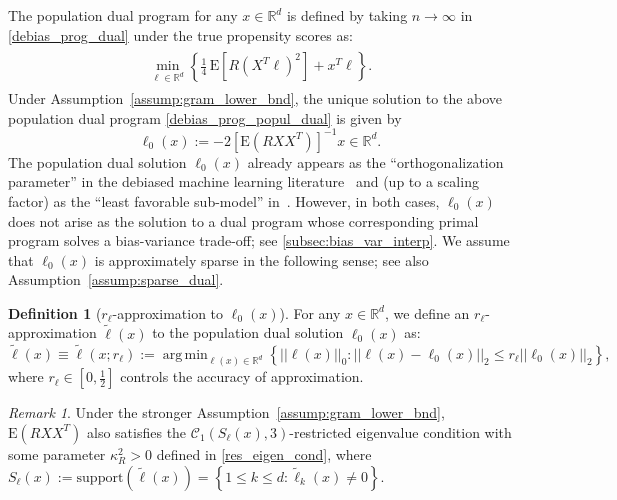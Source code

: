 \documentclass[ejsv2,noshowframe]{imsart}
\theoremstyle{plain}
\theoremstyle{definition}
\newtheorem{definition}[theorem]{Definition}
\theoremstyle{remark}
\newtheorem{remark}{Remark}
\DeclareMathOperator*{\argmin}{arg\,min}
\newcommand{\norm}[1]{\left|\left| #1 \right|\right|}
\renewcommand{\tilde}{\widetilde}
\begin{document}
The population dual program for any $x\in \mathbb{R}^d$ is defined by taking $n\to \infty$ in \eqref{debias_prog_dual} under the true propensity scores as:
\begin{align}
	\label{debias_prog_popul_dual}
	\begin{split}
		\min_{\ell \in \mathbb{R}^d} \left\{ \frac{1}{4}\, \mathrm{E}\left[R \left(X^T\ell\right)^2\right] + x^T \ell  \right\}.
	\end{split}
\end{align}
Under Assumption~\ref{assump:gram_lower_bnd}, the unique solution to the above population dual program \eqref{debias_prog_popul_dual} is given by
\begin{equation}
	\label{popul_dual_exact}
	\ell_0(x) := -2\left[\mathrm{E}\left(R XX^T\right)\right]^{-1} x \in \mathbb{R}^d.
\end{equation}
The population dual solution $\ell_0(x)$ already appears as the ``orthogonalization parameter'' in the debiased machine learning literature~\citep[e.g.][Example 2.1]{chernozhukov2018double} and (up to a scaling factor) as the ``least favorable sub-model'' in~\cite{bellec2022biasing}. However, in both cases, $\ell_0(x)$ does not arise as the solution to a dual program whose corresponding primal program solves a bias-variance trade-off; see \autoref{subsec:bias_var_interp}. We assume that $\ell_0(x)$ is approximately sparse in the following sense; see also Assumption~\ref{assump:sparse_dual}.

\begin{definition}[$r_{\ell}$-approximation to $\ell_0(x)$]
	\label{defn:popul_dual}
	For any $x\in \mathbb{R}^d$, we define an $r_{\ell}$-approximation $\tilde{\ell}(x)$ to the population dual solution $\ell_0(x)$ as:
	\begin{equation}
		\label{popul_dual_approx}
		\tilde{\ell}(x) \equiv \tilde{\ell}(x;r_{\ell}):= \argmin_{\ell(x)\in \mathbb{R}^d} \left\{\norm{\ell(x)}_0: \norm{\ell(x) - \ell_0(x)}_2 \leq r_{\ell}\norm{\ell_0(x)}_2 \right\},
	\end{equation}
	where $r_{\ell} \in \left[0,\frac{1}{2}\right]$ controls the accuracy of approximation.
\end{definition}

\begin{remark}
	\label{remark:res_eigen_ell}
	Under the stronger Assumption~\ref{assump:gram_lower_bnd}, $\mathrm{E}(RXX^T)$ also satisfies the $\mathcal{C}_1(S_{\ell}(x),3)$-restricted eigenvalue condition with some parameter $\kappa_R^2>0$ defined in \eqref{res_eigen_cond}, where $S_{\ell}(x) := \mathrm{support}\left(\tilde{\ell}(x)\right) = \left\{1\leq k\leq d: \tilde{\ell}_k(x) \neq 0\right\}$.
\end{remark}
\end{document}
